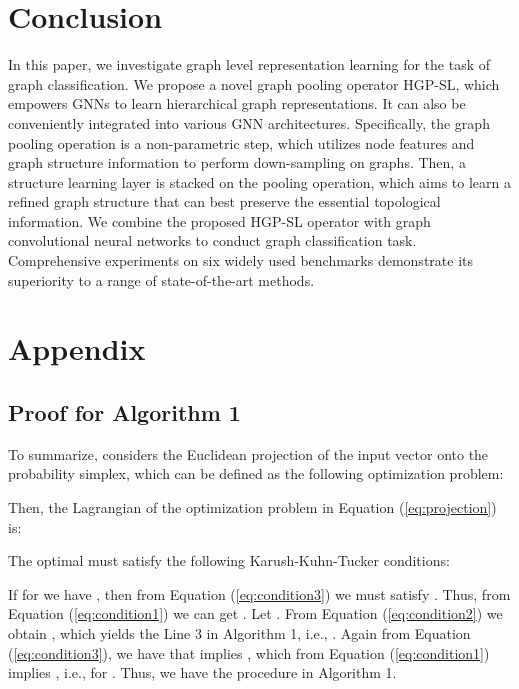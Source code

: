 \documentclass[letterpaper]{article} \usepackage{aaai20}  \usepackage{times}  \usepackage{helvet} \usepackage{courier}  \usepackage[hyphens]{url}  \usepackage{graphicx} \urlstyle{rm} \def\UrlFont{\rm}  \usepackage{graphicx}  \frenchspacing  \setlength{\pdfpagewidth}{8.5in}  \setlength{\pdfpageheight}{11in}
\begin{document}
\section{Conclusion}
In this paper, we investigate graph level representation learning for the task of graph classification. We propose a novel graph pooling operator HGP-SL, which empowers GNNs to learn hierarchical graph representations. It can also be conveniently integrated into various GNN architectures. Specifically, the graph pooling operation is a non-parametric step, which utilizes node features and graph structure information to perform down-sampling on graphs. Then, a structure learning layer is stacked on the pooling operation, which aims to learn a refined graph structure that can best preserve the essential topological information. We combine the proposed HGP-SL operator with graph convolutional neural networks to conduct graph classification task. Comprehensive experiments on six widely used benchmarks demonstrate its superiority to a range of state-of-the-art methods.




\newpage
\section{Appendix}

\subsection{Proof for Algorithm 1}
To summarize,  considers the Euclidean projection of the input vector  onto the probability simplex, which can be defined as the following optimization problem:

Then, the Lagrangian of the optimization problem in Equation (\ref{eq:projection}) is:

The optimal  must satisfy the following Karush-Kuhn-Tucker conditions:



If for  we have , then from Equation (\ref{eq:condition3}) we must satisfy . Thus, from Equation (\ref{eq:condition1}) we can get . Let . From Equation (\ref{eq:condition2}) we obtain , which yields the Line 3 in Algorithm 1, i.e., . Again from Equation (\ref{eq:condition3}), we have that  implies , which from Equation (\ref{eq:condition1}) implies , i.e.,  for . Thus, we have the procedure in Algorithm 1.
\end{document}
